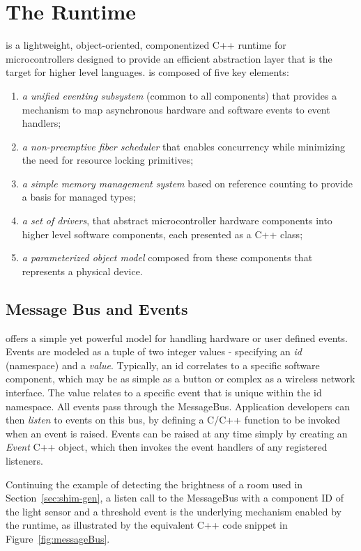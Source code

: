 \section{The \CO Runtime}
\label{sec:codal}

\CO is a lightweight, object-oriented, componentized C++ runtime for microcontrollers designed to provide an efficient abstraction layer that is the target for higher level languages. \CO is composed of five key elements:

\begin{enumerate}
\item \emph{a unified eventing subsystem} (common to all components) that provides a mechanism to map asynchronous hardware and software events to event handlers;
\item \emph{a non-preemptive fiber scheduler} that enables concurrency while minimizing the need for resource locking primitives;
\item \emph{a simple memory management system} based on reference counting to provide a basis for managed types;
\item \emph{a set of drivers}, that abstract microcontroller hardware components into higher level software components, each presented as a C++ class;
\item \emph{a parameterized object model} composed from these components that represents a physical device.
\end{enumerate}

\subsection{Message Bus and Events}

\CO offers a simple yet powerful model for handling hardware or user defined events. Events are modeled as a tuple of two integer values - specifying an \emph{id} (namespace) and a \emph{value}.
Typically, an id correlates to a specific software component, which may be as simple as a button or complex as a wireless network interface. The value relates to a specific event that is unique within the id namespace. All events pass through the \CO MessageBus. Application developers can then \emph{listen} to events on this bus, by defining a C/C++ function to be invoked when an event is raised. Events can be raised at any time simply by creating an \emph{Event} C++ object, which then invokes the event handlers of any registered listeners.

Continuing the example of detecting the brightness of a room used in Section~\ref{sec:shim-gen}, a listen call to the MessageBus with a component ID of the light sensor and a threshold event is the underlying mechanism enabled by the runtime, as illustrated by the equivalent C++ code snippet in Figure~\ref{fig:messageBus}.

